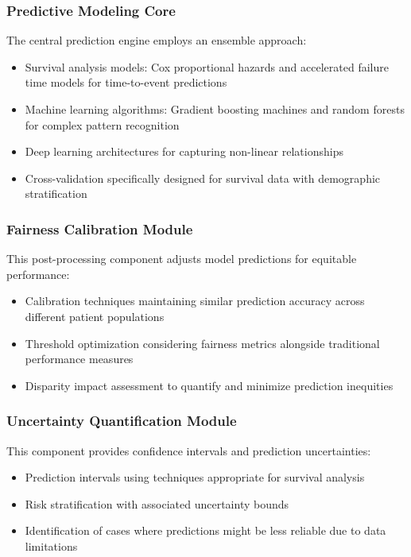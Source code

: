 \subsubsection{Predictive Modeling Core}
The central prediction engine employs an ensemble approach:
\begin{itemize}
    \item Survival analysis models: Cox proportional hazards and accelerated failure time models for time-to-event predictions
    \item Machine learning algorithms: Gradient boosting machines and random forests for complex pattern recognition
    \item Deep learning architectures for capturing non-linear relationships
    \item Cross-validation specifically designed for survival data with demographic stratification
\end{itemize}

\subsubsection{Fairness Calibration Module}
This post-processing component adjusts model predictions for equitable performance:
\begin{itemize}
    \item Calibration techniques maintaining similar prediction accuracy across different patient populations
    \item Threshold optimization considering fairness metrics alongside traditional performance measures
    \item Disparity impact assessment to quantify and minimize prediction inequities
\end{itemize}

\subsubsection{Uncertainty Quantification Module}
This component provides confidence intervals and prediction uncertainties:
\begin{itemize}
    \item Prediction intervals using techniques appropriate for survival analysis
    \item Risk stratification with associated uncertainty bounds
    \item Identification of cases where predictions might be less reliable due to data limitations
\end{itemize}

